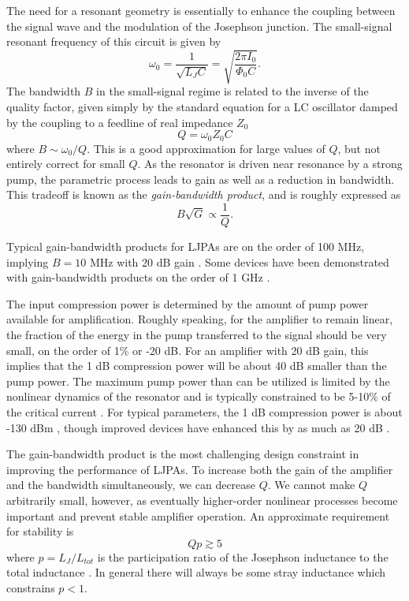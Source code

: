 The need for a resonant geometry is essentially to enhance the coupling between the signal wave and the modulation of the Josephson junction.  The small-signal resonant frequency of this circuit is given by
\begin{equation}
\omega_0 = \frac{1}{\sqrt{L_JC}} = \sqrt{\frac{2\pi I_0}{\Phi_0 C}}.
\label{eq:w0_RLC}
\end{equation}
The bandwidth $B$ in the small-signal regime is related to the inverse of the quality factor, given simply by the standard equation for a LC oscillator damped by the coupling to a feedline of real impedance $Z_0$
\begin{equation}
Q = \omega_0 Z_0 C
\label{eq:Q_RLC}
\end{equation}
where $B \sim \omega_0/Q$.  This is a good approximation for large values of $Q$, but not entirely correct for small $Q$.  As the resonator is driven near resonance by a strong pump, the parametric process leads to gain as well as a reduction in bandwidth.  This tradeoff is known as the \textit{gain-bandwidth product}, and is roughly expressed as
\begin{equation}
B\sqrt{G} \propto \frac{1}{Q}.
\label{eq:g_bw_prod}
\end{equation}

Typical gain-bandwidth products for LJPAs are on the order of 100 MHz, implying $B = 10$ MHz with 20 dB gain \cite{Castellanos-Beltran2007,JPCNature,Hatridge:2011zr}.  Some devices have been demonstrated with gain-bandwidth products on the order of 1 GHz 
\cite{Mutus2014}.

The input compression power is determined by the amount of pump power available for amplification.  Roughly speaking, for the amplifier to remain linear, the fraction of the energy in the pump transferred to the signal should be very small, on the order of 1\% or -20 dB.  For an amplifier with 20 dB gain, this implies that the 1 dB compression power will be about 40 dB smaller than the pump power.  The maximum pump power than can be utilized is limited by the nonlinear dynamics of the resonator and is typically constrained to be 5-10\% of the critical current \cite{slichterthesis}.  For typical parameters, the 1 dB compression power is about -130 dBm \cite{Hatridge:2011zr}, though improved devices have enhanced this by as much as 20 dB \cite{Eichler2014a,Mutus2014}.

The gain-bandwidth product is the most challenging design constraint in improving the performance of LJPAs.  To increase both the gain of the amplifier and the bandwidth simultaneously, we can decrease $Q$.  We cannot make $Q$ arbitrarily small, however, as eventually higher-order nonlinear processes become important and prevent stable amplifier operation.  An approximate requirement for stability is
\begin{equation}
Q p \gtrsim 5
\label{eq:Q_p_prod}
\end{equation}
where $p = L_J / L_{tot}$ is the participation ratio of the Josephson inductance to the total inductance \cite{Weber2014a}.  In general there will always be some stray inductance which constrains $p < 1$.

